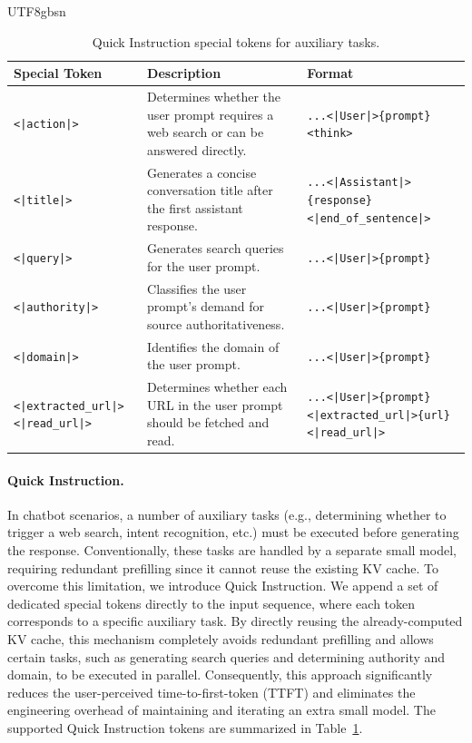 \documentclass[11pt, a4paper, logo, copyright, nonumbering]{deepseek}
\begin{document}
\begin{CJK*}{UTF8}{gbsn}
\begin{table}[h]
\centering
\caption{Quick Instruction special tokens for auxiliary tasks.}
\label{tab:quick_instruction}
\small
\begin{tabular}{p{3cm} p{4.5cm} p{6.5cm}}
\toprule
\textbf{Special Token} & \textbf{Description} & \textbf{Format} \\
\midrule
\texttt{<|action|>} & Determines whether the user prompt requires a web search or can be answered directly. & \texttt{...<|User|>\{prompt\}\allowbreak<think>} \\
\addlinespace
\texttt{<|title|>} & Generates a concise conversation title after the first assistant response. & \texttt{...<|Assistant|>\{response\}\allowbreak<|end\_of\_sentence|>} \\
\addlinespace
\texttt{<|query|>} & Generates search queries for the user prompt. & \texttt{...<|User|>\{prompt\}} \\
\addlinespace
\texttt{<|authority|>} & Classifies the user prompt's demand for source authoritativeness. & \texttt{...<|User|>\{prompt\}} \\
\addlinespace
\texttt{<|domain|>} & Identifies the domain of the user prompt. & \texttt{...<|User|>\{prompt\}} \\
\addlinespace
\texttt{<|extracted\_url|>} \texttt{<|read\_url|>} & Determines whether each URL in the user prompt should be fetched and read. & \texttt{...<|User|>\{prompt\}\allowbreak<|extracted\_url|>\allowbreak\{url\}\allowbreak<|read\_url|>} \\
\bottomrule
\end{tabular}
\end{table}

\paragraph{Quick Instruction.}
In chatbot scenarios, a number of auxiliary tasks (e.g., determining whether to trigger a web search, intent recognition, etc.) must be executed before generating the response. Conventionally, these tasks are handled by a separate small model, requiring redundant prefilling since it cannot reuse the existing KV cache. To overcome this limitation, we introduce Quick Instruction. We append a set of dedicated special tokens directly to the input sequence, where each token corresponds to a specific auxiliary task. By directly reusing the already-computed KV cache, this mechanism completely avoids redundant prefilling and allows certain tasks, such as generating search queries and determining authority and domain, to be executed in parallel. Consequently, this approach significantly reduces the user-perceived time-to-first-token (TTFT) and eliminates the engineering overhead of maintaining and iterating an extra small model. The supported Quick Instruction tokens are summarized in Table~\ref{tab:quick_instruction}.


\end{CJK*}
\end{document}

